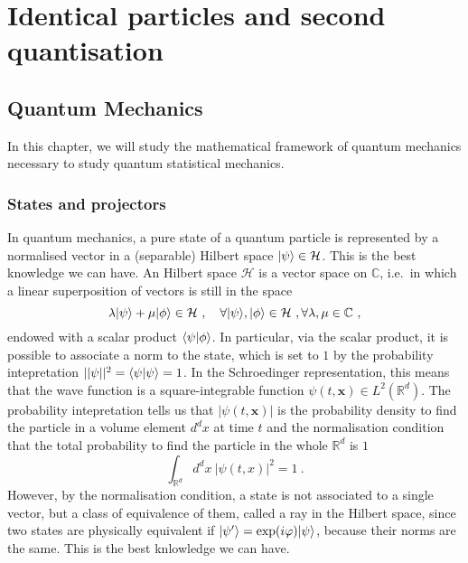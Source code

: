 \part{Identical particles and second quantisation}

\chapter{Quantum Mechanics}

    In this chapter, we will study the mathematical framework of quantum mechanics necessary to study quantum statistical mechanics.

\section{States and projectors}

    In quantum mechanics, a pure state of a quantum particle is represented by a normalised vector in a (separable) Hilbert space $\vert\psi\rangle \in \mathcal H$. This is the best knowledge we can have. An Hilbert space $\mathcal H$ is a vector space on $\mathbb C$, i.e.~in which a linear superposition of vectors is still in the space 
    \begin{equation*}
        \lambda \vert\psi\rangle + \mu \vert\phi\rangle \in \mathcal H ~, \quad \forall \vert\psi\rangle, \vert\phi\rangle \in \mathcal H ~, \forall \lambda, \mu \in \mathbb C ~, 
    \end{equation*}
    endowed with a scalar product $\langle\psi\vert\phi\rangle$. In particular, via the scalar product, it is possible to associate a norm to the state, which is set to $1$ by the probability intepretation $||\psi||^2 = \langle\psi\vert\psi\rangle = 1$. In the Schroedinger representation, this means that the wave function is a square-integrable function $\psi(t,\mathbf x) \in L^2(\mathbb R^d)$. The probability intepretation tells us that $|\psi(t, \mathbf x)|$ is the probability density to find the particle in a volume element $d^d x$ at time $t$ and the normalisation condition that the total probability to find the particle in the whole $\mathbb R^d$ is $1$ 
    \begin{equation*}
        \int_{\mathbb R^d} d^d x ~ |\psi(t,x)|^2 = 1 ~.
    \end{equation*}
    However, by the normalisation condition, a state is not associated to a single vector, but a class of equivalence of them, called a ray in the Hilbert space, since two states are physically equivalent if $\vert\psi'\rangle = \exp(i \varphi) \vert\psi\rangle$, because their norms are the same. This is the best knlowledge we can have.


